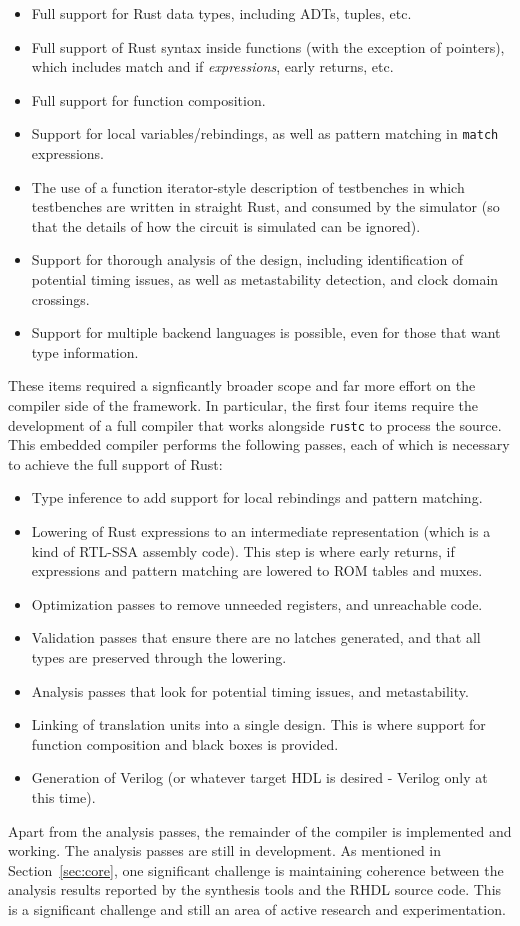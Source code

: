 \documentclass[conference]{IEEEtran}
\begin{document}
\begin{itemize}
  \item Full support for Rust data types, including ADTs, tuples, etc.
  \item Full support of Rust syntax inside functions (with the exception of pointers), which includes 
  match and if \emph{expressions}, early returns, etc.
  \item Full support for function composition.
  \item Support for local variables/rebindings, as well as pattern matching in \verb|match| expressions.
  \item The use of a function iterator-style description of testbenches in which testbenches are written in 
  straight Rust, and consumed by the simulator (so that the details of how the circuit is simulated can be ignored).
  \item Support for thorough analysis of the design, including identification of potential timing issues, as well as
  metastability detection, and clock domain crossings.
  \item Support for multiple backend languages is possible, even for those that want type information.
\end{itemize}

These items required a signficantly broader scope and far more effort on the compiler side of the framework.  In particular,
the first four items require the development of a full compiler that works alongside \verb|rustc| to process the source. 
This embedded compiler performs the following passes, each of which is necessary to achieve the full support of Rust:
\begin {itemize}
  \item Type inference to add support for local rebindings and pattern matching.
  \item Lowering of Rust expressions to an intermediate representation (which is a kind of RTL-SSA assembly code).  This
  step is where early returns, if expressions and pattern matching are lowered to ROM tables and muxes.
  \item Optimization passes to remove unneeded registers, and unreachable code.
  \item Validation passes that ensure there are no latches generated, and that all types are preserved through the lowering.
  \item Analysis passes that look for potential timing issues, and metastability.
  \item Linking of translation units into a single design.  This is where support for function composition and black boxes is
  provided.
  \item Generation of Verilog (or whatever target HDL is desired - Verilog only at this time).
\end{itemize}
Apart from the analysis passes, the remainder of the compiler is implemented and working.  The analysis passes are still in
development.  As mentioned in Section~\ref{sec:core}, one significant challenge is maintaining coherence between the analysis 
results reported by the synthesis tools and the RHDL source code.  This is a significant challenge and still an area of 
active research and experimentation.
\end{document}
